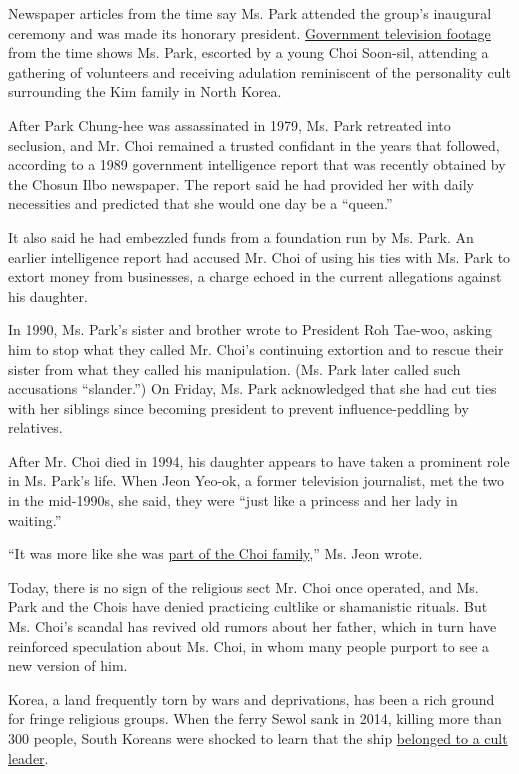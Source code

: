 Newspaper articles from the time say Ms. Park attended the group's
inaugural ceremony and was made its honorary president.
\href{http://newstapa.org/35182}{Government television footage} from the
time shows Ms. Park, escorted by a young Choi Soon-sil, attending a
gathering of volunteers and receiving adulation reminiscent of the
personality cult surrounding the Kim family in North Korea.

After Park Chung-hee was assassinated in 1979, Ms. Park retreated into
seclusion, and Mr. Choi remained a trusted confidant in the years that
followed, according to a 1989 government intelligence report that was
recently obtained by the Chosun Ilbo newspaper. The report said he had
provided her with daily necessities and predicted that she would one day
be a ``queen.''

It also said he had embezzled funds from a foundation run by Ms. Park.
An earlier intelligence report had accused Mr. Choi of using his ties
with Ms. Park to extort money from businesses, a charge echoed in the
current allegations against his daughter.

In 1990, Ms. Park's sister and brother wrote to President Roh Tae-woo,
asking him to stop what they called Mr. Choi's continuing extortion and
to rescue their sister from what they called his manipulation. (Ms. Park
later called such accusations ``slander.'') On Friday, Ms. Park
acknowledged that she had cut ties with her siblings since becoming
president to prevent influence-peddling by relatives.

After Mr. Choi died in 1994, his daughter appears to have taken a
prominent role in Ms. Park's life. When Jeon Yeo-ok, a former television
journalist, met the two in the mid-1990s, she said, they were ``just
like a princess and her lady in waiting.''

``It was more like she was
\href{http://news.naver.com/main/read.nhn?mode=LSD\&mid=sec\&oid=023\&aid=0003223740\&sid1=001}{part
of the Choi family},'' Ms. Jeon wrote.

Today, there is no sign of the religious sect Mr. Choi once operated,
and Ms. Park and the Chois have denied practicing cultlike or
shamanistic rituals. But Ms. Choi's scandal has revived old rumors about
her father, which in turn have reinforced speculation about Ms. Choi, in
whom many people purport to see a new version of him.

Korea, a land frequently torn by wars and deprivations, has been a rich
ground for fringe religious groups. When the ferry Sewol sank in 2014,
killing more than 300 people, South Koreans were shocked to learn that
the ship
\href{http://www.nytimes3xbfgragh.onion/2014/07/27/world/asia/in-ferry-deaths-a-south-korean-tycoons-downfall.html}{belonged
to a cult leader}.

